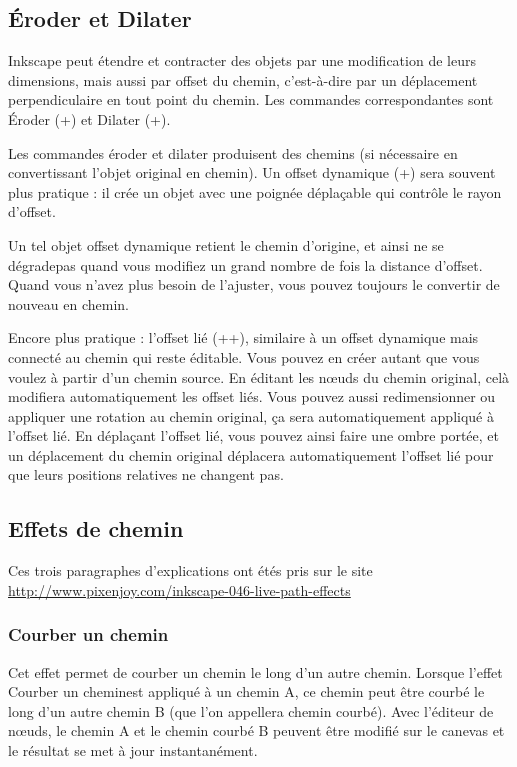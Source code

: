 \documentclass[a4paper,twoside]{article}
\begin{document}
\subsection{Éroder et Dilater}
Inkscape peut étendre et contracter des objets par une modification de leurs dimensions, mais aussi par offset du chemin, c'est-à-dire par un déplacement perpendiculaire en tout point du chemin. Les commandes correspondantes sont Éroder (+\touche{(}) et Dilater (+\touche{)}).

Les commandes éroder et dilater produisent des chemins (si nécessaire en convertissant l'objet original en chemin). Un offset dynamique (+) sera souvent plus pratique : il crée un objet avec une poignée déplaçable qui contrôle le rayon d'offset.

Un tel objet offset dynamique retient le chemin d'origine, et ainsi ne se \og dégrade\fg pas quand vous modifiez un grand nombre de fois la distance d'offset. Quand vous n'avez plus besoin de l'ajuster, vous pouvez toujours le convertir de nouveau en chemin.

Encore plus pratique : l'offset lié (++), similaire à un offset dynamique mais connecté au chemin qui reste éditable. Vous pouvez en créer autant que vous voulez à partir d'un chemin source. En éditant les n\oe uds du chemin original, celà modifiera automatiquement les offset liés. Vous pouvez aussi redimensionner ou appliquer une rotation au chemin original, ça sera automatiquement appliqué à l'offset lié. En déplaçant l'offset lié, vous pouvez ainsi faire une ombre portée, et un déplacement du chemin original déplacera automatiquement l'offset lié pour que leurs positions relatives ne changent pas.

\subsection{Effets de chemin}
Ces trois paragraphes d'explications ont étés pris sur le site \\
\url{http://www.pixenjoy.com/inkscape-046-live-path-effects}
\subsubsection{Courber un chemin}

Cet effet permet de courber un chemin le long d'un autre chemin. Lorsque l'effet \og Courber un chemin\fg  est appliqué à un chemin A, ce chemin peut être courbé le long d'un autre chemin B (que l'on appellera \og chemin courbé\fg ). Avec l'éditeur de n\oe uds, le chemin A et le chemin courbé B peuvent être modifié sur le canevas et le résultat se met à jour instantanément.
\end{document}
